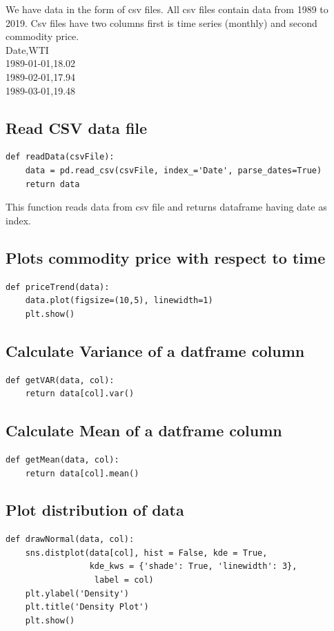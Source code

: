 \documentclass[a4paper,10pt]{article}
\begin{document}
We have data in the form of csv files. All csv files contain data from 1989 to 2019.
Csv files have two columns first is time series (monthly) and second commodity price.\\

Date,WTI\\
1989-01-01,18.02\\
1989-02-01,17.94\\
1989-03-01,19.48\\

\subsection{Read CSV data file}
\begin{lstlisting}
def readData(csvFile):
    data = pd.read_csv(csvFile, index_='Date', parse_dates=True)
    return data
\end{lstlisting}
This function reads data from csv file and returns dataframe having date as index.
\subsection{Plots commodity price with respect to time}
\begin{lstlisting}
def priceTrend(data):
    data.plot(figsize=(10,5), linewidth=1)
    plt.show()
\end{lstlisting}

\subsection{Calculate Variance of a datframe column}
\begin{lstlisting}
def getVAR(data, col):
    return data[col].var()
\end{lstlisting}

\subsection{Calculate Mean of a datframe column}
\begin{lstlisting}
def getMean(data, col):
    return data[col].mean()
\end{lstlisting}



\subsection{Plot distribution of data}
\begin{lstlisting}
def drawNormal(data, col):
    sns.distplot(data[col], hist = False, kde = True,
                 kde_kws = {'shade': True, 'linewidth': 3}, 
                  label = col)
    plt.ylabel('Density')
    plt.title('Density Plot')
    plt.show()
\end{lstlisting}
\end{document}

